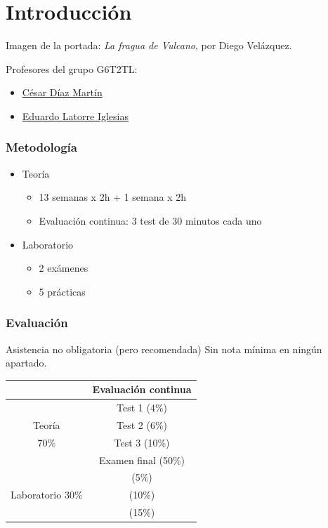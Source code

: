 \documentclass[a4paper]{book}
\begin{document}
\newpage
{}
{}
\section*{Introducción}
Imagen de la portada: \textsl{La fragua de Vulcano}, por Diego Velázquez.

Profesores del grupo G6T2TL:
\begin{itemize}
	\item  \href{mailto:cesar.diazm@upm.es}{César Díaz Martín}
	\item \href{mailto:eduardo.latorre.iglesias@upm.es}{Eduardo Latorre Iglesias}
\end{itemize}

\subsubsection{Metodología} \vspace{\parskip}
\begin{itemize}
	\item Teoría
	      \begin{itemize}
		      \item 13 semanas x 2h + 1 semana x 2h
		      \item Evaluación continua: 3 test de 30 minutos cada uno
	      \end{itemize}
	\item Laboratorio
	      \begin{itemize}
		      \item 2 exámenes
		      \item 5 prácticas
	      \end{itemize}
\end{itemize}

\subsubsection{Evaluación} \vspace{\parskip}
Asistencia no obligatoria (pero recomendada)
Sin nota mínima en ningún apartado.

\begingroup
\renewcommand{\arraystretch}{1.2}
\begin{center}
	\begin{tabular}{c | c }
		                 & Evaluación continua \\ \hline
		                 & Test 1 (4\%)        \\
		Teoría           & Test 2 (6\%)        \\
		70\%             & Test 3 (10\%)       \\
		                 & Examen final (50\%) \\ \hline
		                 & (5\%)               \\
		Laboratorio 30\% & (10\%)              \\
		                 & (15\%)              \\
	\end{tabular}
\end{center}
\endgroup
\end{document}

